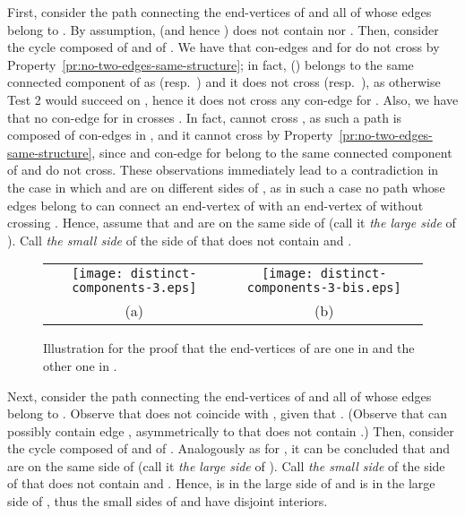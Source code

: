 \documentclass[letter,runningheads]{llncs}
\renewenvironment{proof}
{{\em Proof.\ }}{\hspace*{\fill}\par\vspace{2mm}}
\begin{document}
\begin{proof}
\begin{itemize}
    First, consider the path  connecting the end-vertices of  and all of whose edges belong to . By assumption,  (and hence ) does not contain  nor . Then, consider the cycle  composed of  and of . We have that con-edges  and  for  do not cross  by Property~\ref{pr:no-two-edges-same-structure}; in fact,  () belongs to the same connected component of  as  (resp.\  ) and it does not cross  (resp.\ ), as otherwise {\sc Test 2} would succeed on , hence it does not cross any con-edge for . Also, we have that no con-edge  for  in  crosses . In fact,  cannot cross , as such a path is composed of con-edges in , and it cannot cross  by Property~\ref{pr:no-two-edges-same-structure}, since  and con-edge  for  belong to the same connected component of  and do not cross. These observations immediately lead to a contradiction in the case in which  and  are on different sides of , as in such a case no path whose edges belong to  can connect an end-vertex of  with an end-vertex of  without crossing . Hence, assume that  and  are on the same side of  (call it {\em the large side} of ). Call {\em the small side} of  the side of  that does not contain  and .


\begin{figure}[tb] 
\begin{center}
\begin{tabular}{c c}
\mbox{\texttt{[image: distinct-components-3.eps]}} \hspace{3mm} &
\mbox{\texttt{[image: distinct-components-3-bis.eps]}}\\
(a) \hspace{3mm} & (b)
\end{tabular}
\caption{Illustration for the proof that the end-vertices of  are one in  and the other one in .}
\label{fig:distinct-components-3}
\end{center}
\end{figure}

Next, consider the path  connecting the end-vertices of  and all of whose edges belong to . Observe that  does not coincide with , given that . (Observe that  can possibly contain edge , asymmetrically to   that does not contain .)  Then, consider the cycle  composed of  and of . Analogously as for , it can be concluded that  and  are on the same side of  (call it {\em the large side} of ). Call {\em the small side} of  the side of  that does not contain  and . Hence,  is in the large side of  and  is in the large side of , thus the small sides of   and  have disjoint interiors.


\end{itemize}
\end{proof}
\end{document}
